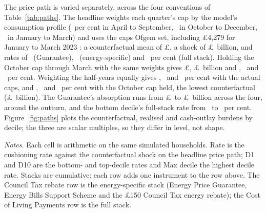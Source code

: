The price path is varied separately, across the four conventions of
Table~\ref{tab:paths}. The
headline weights each quarter's cap by the model's consumption profile
(\SsSeasShareAprSepPct\ per cent in April to September,
\SsSeasShareOctDecPct\ in October to December, \SsSeasShareJanMarPct\
in January to March) and uses the caps Ofgem set, including
\pounds 4{,}279 for January to March 2023 \citep{ofgemcap2023}: a
counterfactual mean of \pounds\SsSeasCwActualCounterCap, a shock of
\pounds\SsSeasCwActualCounterAggBn\ billion, and rates of
\SsSeasCwActualEpgRatePct\ (Guarantee),
\SsSeasCwActualEbssRatePct\ (energy-specific) and
\SsSeasCwActualFullRatePct\ per cent (full stack). Holding the October
cap through March with the same weights gives
\pounds\SsSeasCwHeldCounterCap, \pounds\SsSeasCwHeldCounterAggBn\
billion and \SsSeasCwHeldEpgRatePct, \SsSeasCwHeldEbssRatePct\ and
\SsSeasCwHeldFullRatePct\ per cent. Weighting the half-years equally
gives \SsSeasEqActualEpgRatePct, \SsSeasEqActualEbssRatePct\ and
\SsSeasEqActualFullRatePct\ per cent with the actual caps, and
\SsSeasEqHeldEpgRatePct, \SsSeasEqHeldEbssRatePct\ and
\SsSeasEqHeldFullRatePct\ per cent with the October cap held, the
lowest counterfactual (\pounds\SsSeasEqHeldCounterAggBn\ billion). The
Guarantee's absorption runs from \pounds\SsEpgMinBn\ to
\pounds\SsEpgMaxBn\ billion across the four, around the outturn, and
the bottom decile's full-stack rate from \SsFullDOneMinPct\ to
\SsFullDOneMaxPct\ per cent. Figure~\ref{fig:paths} plots the
counterfactual, realised and cash-outlay burdens by decile; the three
are scalar multiples, so they differ in level, not shape.

\begin{table}[tbp]
\centering
\caption{Cushioning rates by rebase factor and instrument stack}
\label{tab:grid}
\footnotesize\setlength{\tabcolsep}{4pt}

\begin{minipage}{.85\textwidth}\footnotesize
\emph{Notes.} Each cell is arithmetic on the same simulated
households. Rate is the cushioning rate against the counterfactual
shock on the headline price path; D1 and D10 are the bottom- and
top-decile rates and Max decile the highest decile rate. Stacks are
cumulative: each row adds one instrument to the row above. The
Council Tax rebate row is the energy-specific stack (Energy Price
Guarantee, Energy Bills Support Scheme and the \pounds 150 Council
Tax energy rebate); the Cost of Living Payments row is the full
stack.
\end{minipage}
\end{table}


